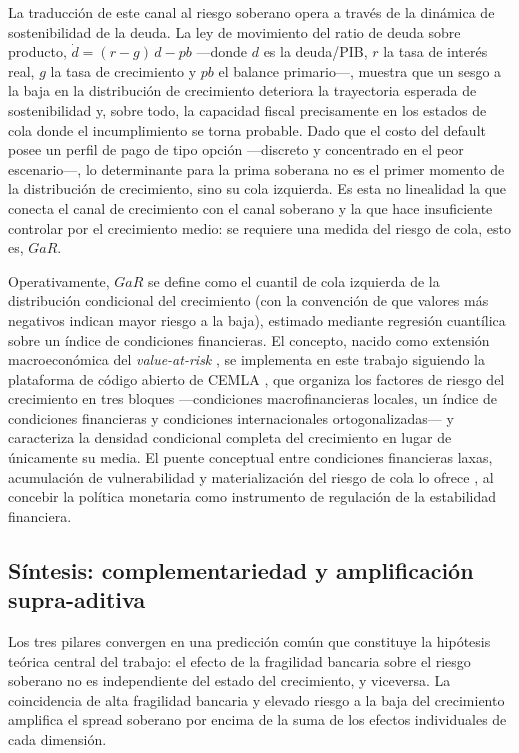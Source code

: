 La traducción de este canal al riesgo soberano opera a través de la dinámica de sostenibilidad de la deuda. La ley de movimiento del ratio de deuda sobre producto, $\dot{d} = (r - g)\,d - pb$ —donde $d$ es la deuda/PIB, $r$ la tasa de interés real, $g$ la tasa de crecimiento y $pb$ el balance primario—, muestra que un sesgo a la baja en la distribución de crecimiento deteriora la trayectoria esperada de sostenibilidad y, sobre todo, la capacidad fiscal precisamente en los estados de cola donde el incumplimiento se torna probable. Dado que el costo del default posee un perfil de pago de tipo opción —discreto y concentrado en el peor escenario—, lo determinante para la prima soberana no es el primer momento de la distribución de crecimiento, sino su cola izquierda. Es esta no linealidad la que conecta el canal de crecimiento con el canal soberano y la que hace insuficiente controlar por el crecimiento medio: se requiere una medida del riesgo de cola, esto es, $GaR$.

Operativamente, $GaR$ se define como el cuantil de cola izquierda de la distribución condicional del crecimiento (con la convención de que valores más negativos indican mayor riesgo a la baja), estimado mediante regresión cuantílica \citep{KoenkerBassett1978,Koenker2004} sobre un índice de condiciones financieras. El concepto, nacido como extensión macroeconómica del \textit{value-at-risk} \citep{PrasadEtAl2019}, se implementa en este trabajo siguiendo la plataforma de código abierto de CEMLA \citep{OssandonBusch2022}, que organiza los factores de riesgo del crecimiento en tres bloques —condiciones macrofinancieras locales, un índice de condiciones financieras y condiciones internacionales ortogonalizadas— y caracteriza la densidad condicional completa del crecimiento en lugar de únicamente su media. El puente conceptual entre condiciones financieras laxas, acumulación de vulnerabilidad y materialización del riesgo de cola lo ofrece \citet{Stein2012}, al concebir la política monetaria como instrumento de regulación de la estabilidad financiera.

\subsection{Síntesis: complementariedad y amplificación supra-aditiva}

Los tres pilares convergen en una predicción común que constituye la hipótesis teórica central del trabajo: el efecto de la fragilidad bancaria sobre el riesgo soberano no es independiente del estado del crecimiento, y viceversa. La coincidencia de alta fragilidad bancaria y elevado riesgo a la baja del crecimiento amplifica el spread soberano por encima de la suma de los efectos individuales de cada dimensión.


